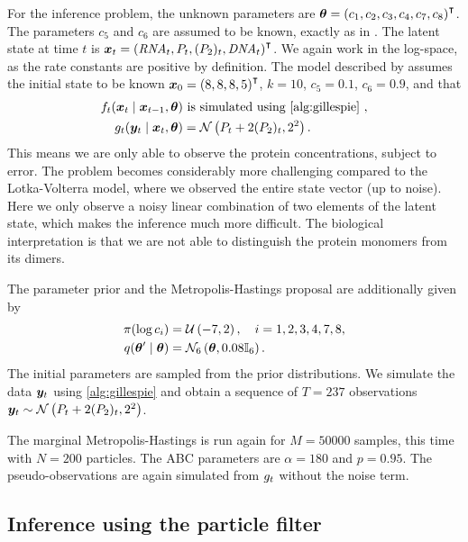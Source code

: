 For the inference problem, the unknown parameters are $\bm{\theta} = \left(c_1, c_2, c_3, c_4, c_7, c_8\right)^\intercal$. The parameters $c_5$ and $c_6$ are assumed to be known, exactly as in \cite{wilkinson}. The latent state at time $t$ is $\bm{x}_t = \left(\mathit{RNA}_t, P_t, (P_2)_t, \mathit{DNA}_t\right)^\intercal$. We again work in the log-space, as the rate constants are positive by definition. The model described by \cite{wilkinson} assumes the initial state to be known $\bm{x}_0 = \left(8,8,8,5\right)^\intercal$, ${k = 10}$, ${c_5 = 0.1}$, ${c_6 = 0.9}$, and that
\begin{equation*}
\begin{split}
\trans_t(\bx_t \mid \bx_{t-1}, \btheta) & \text{ is simulated using \autoref{alg:gillespie} }, \\
\obs_t(\by_t \mid \bx_{t}, \btheta) &= \mathcal{N}\left(P_t + 2 (P_2)_t, 2^2\right).
\end{split}
\end{equation*}
This means we are only able to observe the protein concentrations, subject to error. The problem becomes considerably more challenging compared to the Lotka-Volterra model, where we observed the entire state vector (up to noise). Here we only observe a noisy linear combination of two elements of the latent state, which makes the inference much more difficult. The biological interpretation is that we are not able to distinguish the protein monomers from its dimers.

The parameter prior and the Metropolis-Hastings proposal are additionally given by
\begin{equation*}
\begin{split}
\pi(\log c_i) &= \mathcal{U}\left(-7, 2\right), \quad i = 1, 2, 3, 4, 7, 8, \\
q(\bm{\theta}^\prime \mid \bm{\theta}) &= \mathcal{N}_6\left(\bm{\theta}, 0.08 \mathbb{I}_6\right).
\end{split}
\end{equation*}
The initial parameters are sampled from the prior distributions. We simulate the data $\bm{y}_t$ using \autoref{alg:gillespie} and obtain a sequence of $T = 237$ observations $\bm{y}_t \sim \mathcal{N}\left(P_t + 2 (P_2)_t, 2^2\right)$.

The marginal Metropolis-Hastings is run again for $M = 50000$ samples, this time with $N = 200$ particles. The ABC parameters are $\alpha = 180$ and $p = 0.95$. The pseudo-observations are again simulated from $g_t$ without the noise term.

\subsection{Inference using the particle filter}


